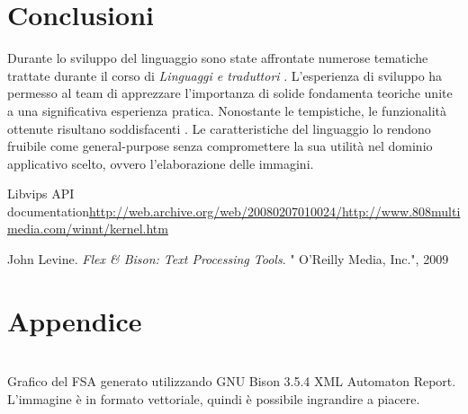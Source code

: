 \documentclass[10pt]{article}
\begin{document}
\section{Conclusioni}
Durante lo sviluppo del linguaggio sono state affrontate numerose tematiche trattate durante il corso di \textit{Linguaggi e traduttori} . L'esperienza di sviluppo ha permesso al team di apprezzare l'importanza di solide fondamenta teoriche unite a una significativa esperienza pratica. Nonostante le tempistiche, le funzionalità ottenute risultano soddisfacenti . Le caratteristiche del linguaggio lo rendono fruibile come general-purpose senza compromettere la sua utilità nel dominio applicativo scelto, ovvero l'elaborazione delle immagini.
\clearpage

\clearpage


\begin{thebibliography}{toc}
	
	Libvips API documentation{ {\url{http://web.archive.org/web/20080207010024/http://www.808multimedia.com/winnt/kernel.htm}}}

	 John Levine.\textit{ Flex \& Bison: Text Processing Tools}. " O’Reilly Media, Inc.", 2009
\end{thebibliography}

\clearpage
\section*{Appendice}\label{section:appendix}

\begin{center}
	\centering
	\\
	Grafico del FSA generato utilizzando GNU Bison 3.5.4 XML Automaton Report. L'immagine è in formato vettoriale, quindi è possibile ingrandire a piacere.
\end{center}
\clearpage
\end{document}
